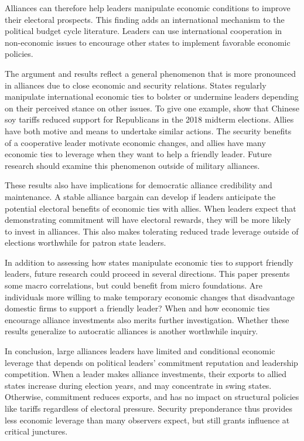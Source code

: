 \documentclass[12pt]{article}
\begin{document}
Alliances can therefore help leaders manipulate economic conditions to improve their electoral prospects. 
This finding adds an international mechanism to the political budget cycle literature.
Leaders can use international cooperation in non-economic issues to encourage other states to implement favorable economic policies. 


The argument and results reflect a general phenomenon that is more pronounced in alliances due to close economic and security relations. 
States regularly manipulate international economic ties to bolster or undermine leaders depending on their perceived stance on other issues. 
To give one example, \citet{ChyzhUrbatsch2021} show that Chinese soy tariffs reduced support for Republicans in the 2018 midterm elections. 
Allies have both motive and means to undertake similar actions. 
The security benefits of a cooperative leader motivate economic changes, and allies have many economic ties to leverage when they want to help a friendly leader. 
Future research should examine this phenomenon outside of military alliances.


These results also have implications for democratic alliance credibility and maintenance. 
A stable alliance bargain can develop if leaders anticipate the potential electoral benefits of economic ties with allies.
When leaders expect that demonstrating commitment will have electoral rewards, they will be more likely to invest in alliances. 
This also makes tolerating reduced trade leverage outside of elections worthwhile for patron state leaders.


In addition to assessing how states manipulate economic ties to support friendly leaders, future research could proceed in several directions. 
This paper presents some macro correlations, but could benefit from micro foundations. 
Are individuals more willing to make temporary economic changes that disadvantage domestic firms to support a friendly leader? 
When and how economic ties encourage alliance investments also merits further investigation.
Whether these results generalize to autocratic alliances is another worthwhile inquiry. 


In conclusion, large alliances leaders have limited and conditional economic leverage that depends on political leaders' commitment reputation and leadership competition. 
When a leader makes alliance investments, their exports to allied states increase during election years, and may concentrate in swing states. 
Otherwise, commitment reduces exports, and has no impact on structural policies like tariffs regardless of electoral pressure. 
Security preponderance thus provides less economic leverage than many observers expect, but still grants influence at critical junctures.


\newpage
\singlespace
 
 
\end{document}
